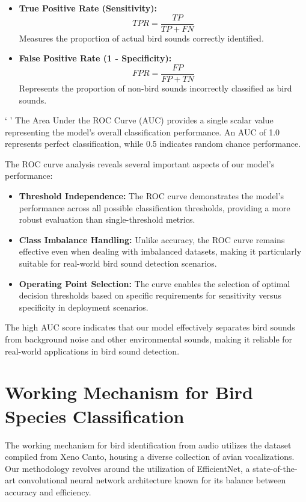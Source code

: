       \begin{itemize}
      \item \textbf{True Positive Rate (Sensitivity):}
      \begin{equation}
            TPR = \frac{TP}{TP + FN}
      \end{equation}
      Measures the proportion of actual bird sounds correctly identified.

      \item \textbf{False Positive Rate (1 - Specificity):}
      \begin{equation}
            FPR = \frac{FP}{FP + TN}
      \end{equation}
      Represents the proportion of non-bird sounds incorrectly classified as bird sounds.
      \end{itemize}
 `    '
      The Area Under the ROC Curve (AUC) provides a single scalar value representing the model's overall classification performance. An AUC of 1.0 represents perfect classification, while 0.5 indicates random chance performance.

      The ROC curve analysis reveals several important aspects of our model's performance:

      \begin{itemize}
      \item \textbf{Threshold Independence:} The ROC curve demonstrates the model's performance across all possible classification thresholds, providing a more robust evaluation than single-threshold metrics.
      
      \item \textbf{Class Imbalance Handling:} Unlike accuracy, the ROC curve remains effective even when dealing with imbalanced datasets, making it particularly suitable for real-world bird sound detection scenarios.
      
      \item \textbf{Operating Point Selection:} The curve enables the selection of optimal decision thresholds based on specific requirements for sensitivity versus specificity in deployment scenarios.
      \end{itemize}

      The high AUC score indicates that our model effectively separates bird sounds from background noise and other environmental sounds, making it reliable for real-world applications in bird sound detection.




\section{Working Mechanism for Bird Species Classification}
        The working mechanism for bird identification from audio utilizes the dataset
        compiled from Xeno Canto, housing a diverse collection of avian vocalizations.
        Our methodology revolves around the utilization of EfficientNet, a
        state-of-the-art convolutional neural network architecture known for its
        balance between accuracy and efficiency.

